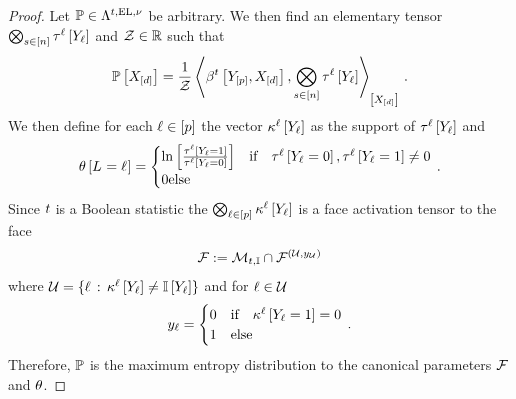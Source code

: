 \begin{proof}
    Let $\mathbb{P}\in\Lambda^{t,\mathrm{EL},\nu}$ be arbitrary.
    We then find an elementary tensor $\bigotimes_{s\in[n]}\tau^{\ell}\left[Y_{\ell}\right]$ and $\mathcal{Z}\in\mathbb{R}$ such that
    \begin{align*}
        \mathbb{P}\left[X_{[d]}\right]
        = \frac{1}{\mathcal{Z}} \left\langle \beta^{t}\left[Y_{[p]},X_{[d]}\right],\bigotimes_{s\in[n]}\tau^{\ell}\left[Y_{\ell}\right]\right\rangle_{\left[ X_{[d]} \right]} \, .
    \end{align*}
    We then define for each $\ell\in[p]$ the vector $\kappa^{\ell}\left[Y_{\ell}\right]$ as the support of $\tau^{\ell}\left[Y_{\ell}\right]$ and
    \begin{align*}
        \theta\left[L_{}=\ell_{}\right]
        = \begin{cases}
              \ln \left[ \frac{\tau^{\ell}\left[Y_{\ell}=1\right]}{\tau^{\ell}\left[Y_{\ell}=0\right]} \right] & \text{if}\quad \tau^{\ell}\left[Y_{\ell}=0\right],\tau^{\ell}\left[Y_{\ell}=1\right] \neq 0 \\
              0 \text{else}
        \end{cases} \, .
    \end{align*}
    Since $t$ is a Boolean statistic the $\bigotimes_{\ell\in[p]}\kappa^{\ell}\left[Y_{\ell}\right]$ is a face activation tensor to the face
    \begin{align*}
        \mathcal{F} := \mathcal{M}_{t,\mathbb{I}} \cap \mathcal{F}^{(\mathcal{U},y_{\mathcal{U}})}
    \end{align*}
    where $\mathcal{U}=\{\ell\,:\,\kappa^{\ell}\left[Y_{\ell}\right]\neq \mathbb{I}\left[Y_{\ell}\right]\}$ and for $\ell\in\mathcal{U}$
    \begin{align*}
        y_{\ell}
        = \begin{cases}
              0 & \text{if}\quad \kappa^{\ell}\left[Y_{\ell}=1\right] = 0 \\
              1 & \text{else}
        \end{cases} \, .
    \end{align*}
    Therefore, $\mathbb{P}$ is the maximum entropy distribution to the canonical parameters $\mathcal{F}$ and $\theta$.
\end{proof}

